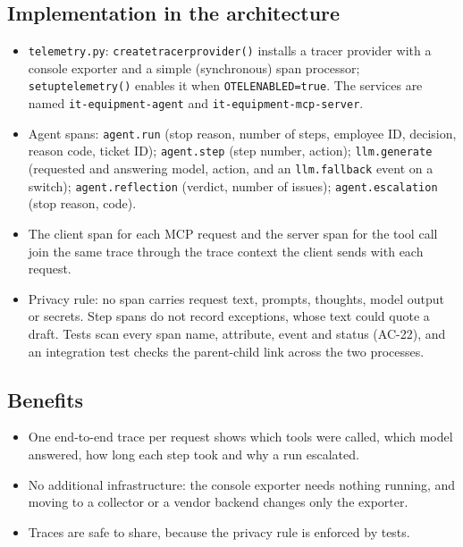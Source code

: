 \documentclass[11pt,letterpaper]{article}
\renewcommand{\_}{\textunderscore\allowbreak}
\begin{document}
\subsection*{Implementation in the architecture}
\begin{itemize}
  \item \texttt{telemetry.py}: \texttt{create\_tracer\_provider()} installs a tracer provider with
  a console exporter and a simple (synchronous) span processor; \texttt{setup\_telemetry()}
  enables it when \texttt{OTEL\_ENABLED=true}. The services are named
  \texttt{it-equipment-agent} and \texttt{it-equipment-mcp-server}.
  \item Agent spans: \texttt{agent.run} (stop reason, number of steps, employee ID, decision,
  reason code, ticket ID); \texttt{agent.step} (step number, action); \texttt{llm.generate}
  (requested and answering model, action, and an \texttt{llm.fallback} event on a switch);
  \texttt{agent.reflection} (verdict, number of issues); \texttt{agent.escalation} (stop reason,
  code).
  \item The client span for each MCP request and the server span for the tool call join the same
  trace through the trace context the client sends with each request.
  \item Privacy rule: no span carries request text, prompts, thoughts, model output or secrets.
  Step spans do not record exceptions, whose text could quote a draft. Tests scan every span name,
  attribute, event and status (AC-22), and an integration test checks the parent-child link
  across the two processes.
\end{itemize}

\subsection*{Benefits}
\begin{itemize}
  \item One end-to-end trace per request shows which tools were called, which model answered,
  how long each step took and why a run escalated.
  \item No additional infrastructure: the console exporter needs nothing running, and moving to
  a collector or a vendor backend changes only the exporter.
  \item Traces are safe to share, because the privacy rule is enforced by tests.
\end{itemize}
\end{document}

